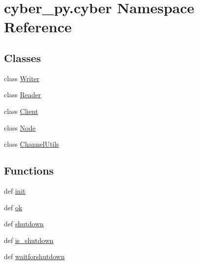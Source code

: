 \hypertarget{namespacecyber__py_1_1cyber}{\section{cyber\-\_\-py.\-cyber Namespace Reference}
\label{namespacecyber__py_1_1cyber}
}
\subsection*{Classes}
\begin{DoxyCompactItemize}
\item 
class \hyperlink{classcyber__py_1_1cyber_1_1Writer}{Writer}
\item 
class \hyperlink{classcyber__py_1_1cyber_1_1Reader}{Reader}
\item 
class \hyperlink{classcyber__py_1_1cyber_1_1Client}{Client}
\item 
class \hyperlink{classcyber__py_1_1cyber_1_1Node}{Node}
\item 
class \hyperlink{classcyber__py_1_1cyber_1_1ChannelUtils}{Channel\-Utils}
\end{DoxyCompactItemize}
\subsection*{Functions}
\begin{DoxyCompactItemize}
\item 
def \hyperlink{namespacecyber__py_1_1cyber_ac5dda5ce1579255672ccd20e200eef6e}{init}
\item 
def \hyperlink{namespacecyber__py_1_1cyber_aacd6b88be138f317081a3270aac80eb4}{ok}
\item 
def \hyperlink{namespacecyber__py_1_1cyber_a7977093d48defe12009683277367d2f6}{shutdown}
\item 
def \hyperlink{namespacecyber__py_1_1cyber_ab17bb5a61b146ffd5050f4bc28370bea}{is\-\_\-shutdown}
\item 
def \hyperlink{namespacecyber__py_1_1cyber_a017bbe6726341a06f0ae2b9cea0918c3}{waitforshutdown}
\end{DoxyCompactItemize}
